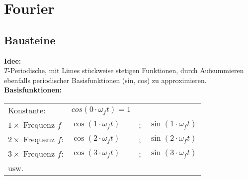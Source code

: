 \section{Fourier}
	\subsection{Bausteine}
		\textbf{Idee:}\\[3pt]
		$T$-Periodische, mit Limes stückweise stetigen Funktionen, durch Aufsummieren ebenfalls periodischer Basisfunktionen
		(sin, cos) zu approximieren.\\[3pt]
		
		\textbf{Basisfunktionen:}\\[3pt]
		\begin{minipage}[t]{0.5\textwidth}
			\begin{tabular}{llll}
				Konstante: & $cos(0 \cdot \omega_{f} t) = 1$ & &\\[3pt]
				$1 \times$ Frequenz $f$  & $\cos(1 \cdot \omega_{f} t)$ & ; & $\sin(1 \cdot \omega_{f} t)$\\[3pt]
				$2 \times$ Frequenz $f$: & $\cos(2 \cdot \omega_{f} t)$ & ; & $\sin(2 \cdot \omega_{f} t)$\\[3pt]
				$3 \times$ Frequenz $f$: & $\cos(3 \cdot \omega_{f} t)$ & ; & $\sin(3 \cdot \omega_{f} t)$\\[3pt]
				usw. & & &\\[3pt]
			\end{tabular}
		\end{minipage}
		\begin{minipage}[t]{0.2\textwidth}
			
		\end{minipage}
		\begin{minipage}[t]{0.3\textwidth}
		\end{minipage}
	
